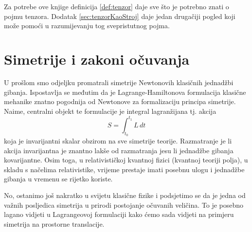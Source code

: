 Za potrebe ove knjige definicija \ref{def:tenzor} daje sve što
je potrebno znati o pojmu tenzora. Dodatak \ref{sec:tenzorKaoStroj} daje
jedan drugačiji pogled koji može pomoći u razumijevanju tog
svepristutnog pojma.


\section{Simetrije i zakoni očuvanja}
\label{sec:noether}

U prošlom smo odjeljku promatrali simetrije Newtonovih klasičnih jednadžbi
gibanja. Ispostavlja se međutim da je
Lagrange-Hamiltonova formulacija klasične mehanike znatno pogodnija od
Newtonove za formalizaciju principa simetrije. Naime, centralni objekt
te formulacije je integral lagranžijana tj. akcija
\begin{equation}
S = \int_{t_0}^{t_1}  L\, dt
    \label{eq:akcija}
\end{equation}
koja je invarijantni skalar obzirom na sve simetrije teorije. Razmatranje
je li akcija invarijantna je znantno lakše od razmatranja jesu li jednadžbe
gibanja kovarijantne. Osim toga, u relativističkoj kvantnoj fizici
(kvantnoj teoriji polja), u skladu s načelima relativistike,
vrijeme prestaje imati posebnu ulogu i jednadžbe gibanja
u vremenu se rijetko koriste. 

No, ostanimo još nakratko u svijetu klasične fizike i podsjetimo se da je jedna
od važnih posljedica simetrija u prirodi postojanje očuvanih veličina.
To je posebno lagano vidjeti u Lagrangeovoj formulaciji kako ćemo sada
vidjeti na primjeru simetrija na prostorne translacije.

